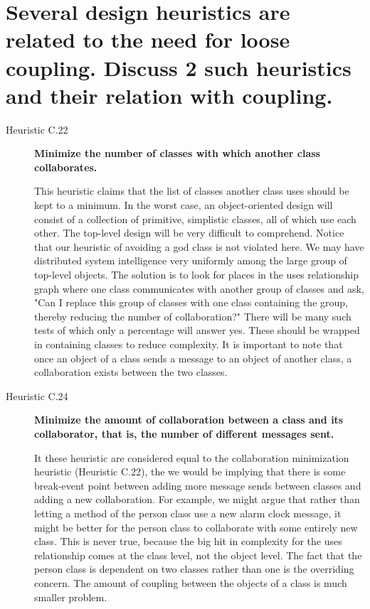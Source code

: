 \section{Several design heuristics are related to the need for loose coupling. Discuss 2 such heuristics and their relation with coupling.}

\begin{description}
\item[Heuristic C.22] \textbf{Minimize the number of classes with which another class collaborates.}


This heuristic claims that the list of classes another class uses should be kept to a minimum. In the worst case, an object-oriented design will consist of a collection of primitive, simplistic classes, all of which use each other. The top-level design will be very difficult to comprehend. Notice that our heuristic of avoiding a god class is not violated here. We may have distributed system intelligence very uniformly among the large group of top-level objects. The solution is to look for places in the uses relationship graph where one class communicates with another group of classes and ask, "Can I replace this group of classes with one class containing the group, thereby reducing the number of collaboration?" There will be many such tests of which only a percentage will answer yes. These should be wrapped in containing classes to reduce complexity.
It is important to note that once an object of a class sends a message to an object of another class, a collaboration exists between the two classes.

\item[Heuristic C.24] \textbf{ Minimize the amount of collaboration between a class
and its collaborator, that is, the number of different messages sent.}

It these heuristic are considered equal to the collaboration minimization heuristic (Heuristic C.22), the we would be implying that there is some break-event point between adding more message sends between classes and adding a new collaboration. For example, we might argue that rather than letting a method of the person class use a new alarm clock message, it might be better for the person class to collaborate with some entirely new class. This is never true, because the big hit in complexity for the uses relationship comes at the class level, not the object level. The fact that the person class is dependent on two classes rather than one is the overriding concern. The amount of coupling between the objects of a class is much smaller problem.

\end{description}

